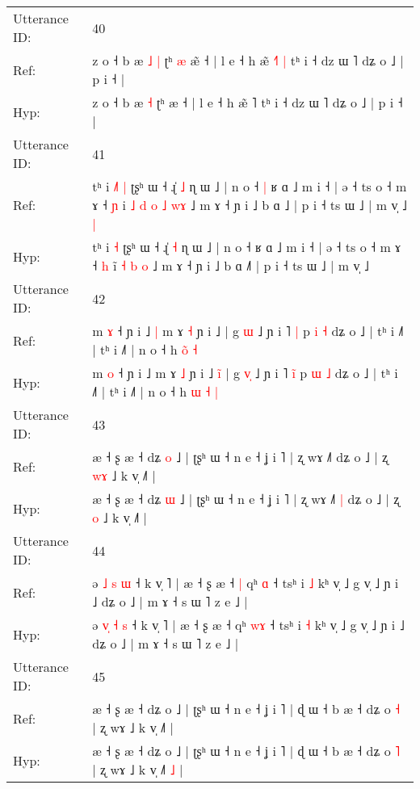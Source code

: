 \documentclass[10pt]{article}
\DeclareRobustCommand{\hl}[1]{{\textcolor{red}{#1}}}
\begin{document}
\begin{longtable}{ll}
\midrule
Utterance ID: & 40 \\
Ref: & z o ˧ b æ\hl{ }\hl{˩} \hl{|} ʈʰ\hl{ }\hl{æ} æ\hl{̃} ˧ | l e ˧ h æ̃ \hl{˧}˥\hl{ }\hl{|} tʰ i ˧ dz ɯ ˥ dʑ o ˩ | p i ˧ |
 \\
Hyp: & z o ˧ b æ\hl{}\hl{} \hl{˧} ʈʰ\hl{}\hl{} æ\hl{} ˧ | l e ˧ h æ̃ \hl{}˥\hl{}\hl{} tʰ i ˧ dz ɯ ˥ dʑ o ˩ | p i ˧ |
 \\
\midrule
Utterance ID: & 41 \\
Ref: & tʰ i\hl{ }\hl{˩}\hl{˥} \hl{|} ʈʂʰ ɯ ˧ ɻ̍ \hl{˩} ɳ ɯ ˩ | n o ˧\hl{ }\hl{|} ʁ ɑ ˩ m i ˧ | ə ˧ ts o ˧ m ɤ ˧ \hl{ɲ} i\hl{ }\hl{˩}\hl{ }\hl{d} \hl{o} \hl{˩} \hl{w}\hl{ɤ} ˩ m ɤ ˧ ɲ i ˩ b ɑ ˩\hl{} | p i ˧ ts ɯ ˩ | m v̩ ˩\hl{ }\hl{|}
 \\
Hyp: & tʰ i\hl{}\hl{}\hl{} \hl{˧} ʈʂʰ ɯ ˧ ɻ̍ \hl{˧} ɳ ɯ ˩ | n o ˧\hl{}\hl{} ʁ ɑ ˩ m i ˧ | ə ˧ ts o ˧ m ɤ ˧ \hl{h} i\hl{}\hl{}\hl{}\hl{̃} \hl{˧} \hl{b} \hl{}\hl{o} ˩ m ɤ ˧ ɲ i ˩ b ɑ ˩\hl{˥} | p i ˧ ts ɯ ˩ | m v̩ ˩\hl{}\hl{}
 \\
\midrule
Utterance ID: & 42 \\
Ref: & m \hl{ɤ} ˧ ɲ i ˩\hl{ }\hl{|} m ɤ \hl{˧} ɲ i ˩\hl{}\hl{}\hl{} | g \hl{}\hl{ɯ} ˩ ɲ i ˥ \hl{}\hl{|} p \hl{i} \hl{˧} dʑ o ˩ | tʰ i ˩˥ | tʰ i ˩˥ | n o ˧ h \hl{}\hl{o}\hl{̃} \hl{˧}
 \\
Hyp: & m \hl{o} ˧ ɲ i ˩\hl{}\hl{} m ɤ \hl{˩} ɲ i ˩\hl{ }\hl{i}\hl{̃} | g \hl{v}\hl{̩} ˩ ɲ i ˥ \hl{i}\hl{̃} p \hl{ɯ} \hl{˩} dʑ o ˩ | tʰ i ˩˥ | tʰ i ˩˥ | n o ˧ h \hl{ɯ}\hl{ }\hl{˧} \hl{|}
 \\
\midrule
Utterance ID: & 43 \\
Ref: & æ ˧ ʂ æ ˧ dʑ \hl{o} ˩ | ʈʂʰ ɯ ˧ n e ˧ ʝ i ˥ | ʐ wɤ ˩˥\hl{}\hl{} dʑ o ˩ | ʐ \hl{w}\hl{ɤ} ˩ k v̩ ˩˥ |
 \\
Hyp: & æ ˧ ʂ æ ˧ dʑ \hl{ɯ} ˩ | ʈʂʰ ɯ ˧ n e ˧ ʝ i ˥ | ʐ wɤ ˩˥\hl{ }\hl{|} dʑ o ˩ | ʐ \hl{}\hl{o} ˩ k v̩ ˩˥ |
 \\
\midrule
Utterance ID: & 44 \\
Ref: & ə \hl{}\hl{˩} \hl{s} \hl{ɯ} ˧ k v̩ ˥ | æ ˧ ʂ æ ˧\hl{ }\hl{|} qʰ \hl{}\hl{ɑ} ˧ tsʰ i \hl{˩} kʰ v̩ ˩ g v̩ ˩ ɲ i ˩ dʑ o ˩ | m ɤ ˧ s ɯ ˥ z e ˩ |
 \\
Hyp: & ə \hl{v}\hl{̩} \hl{˧} \hl{s} ˧ k v̩ ˥ | æ ˧ ʂ æ ˧\hl{}\hl{} qʰ \hl{w}\hl{ɤ} ˧ tsʰ i \hl{˧} kʰ v̩ ˩ g v̩ ˩ ɲ i ˩ dʑ o ˩ | m ɤ ˧ s ɯ ˥ z e ˩ |
 \\
\midrule
Utterance ID: & 45 \\
Ref: & æ ˧ ʂ æ ˧ dʑ o ˩ | ʈʂʰ ɯ ˧ n e ˧ ʝ i ˥ | ɖ ɯ ˧ b æ ˧ dʑ o \hl{˧} | ʐ wɤ ˩ k v̩ ˩˥\hl{}\hl{} |
 \\
Hyp: & æ ˧ ʂ æ ˧ dʑ o ˩ | ʈʂʰ ɯ ˧ n e ˧ ʝ i ˥ | ɖ ɯ ˧ b æ ˧ dʑ o \hl{˥} | ʐ wɤ ˩ k v̩ ˩˥\hl{ }\hl{˩} |

\end{longtable}
\end{document}

